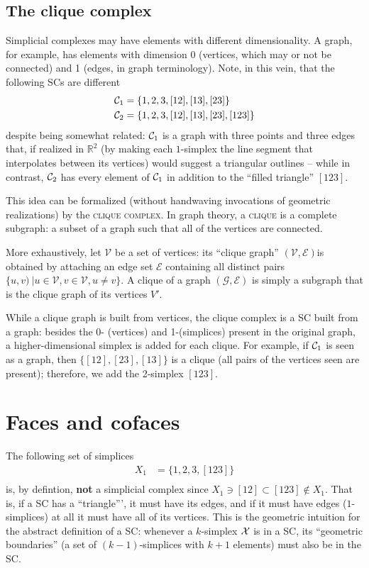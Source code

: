 \documentclass{tufte-handout}
\newcommand{\re}{\mathbb{R}}
\begin{document}
\subsection{The clique complex}
Simplicial complexes may have elements with different dimensionality. A graph, for example, has elements with dimension 0 (vertices, which may or not be connected) and 1 (edges, in graph terminology). Note, in this vein, that the following SCs are different
\begin{align*}
    \sc_1 &= \{1,2,3,[12],[13],[23]\}\\
    \sc_2 &= \{1,2,3,[12],[13],[23],[123]\}
\end{align*}
despite being somewhat related: $\sc_1$ is a graph with three points and three edges that, if realized in $\re^2$ (by making each $1$-simplex the line segment that interpolates between its vertices) would suggest a triangular outlines -- while in contrast, $\sc_2$ has every element of $\sc_1$ in addition to the ``filled triangle'' $[123]$. 

This idea can be formalized (without handwaving invocations of geometric realizations) by the \textsc{clique complex}. In graph theory, a \textsc{clique} is a complete subgraph: a subset of a graph such that all of the vertices are connected. 

More exhaustively,  let  $\mathcal V$ be a set of vertices: its ``clique graph'' $(\mathcal V, \mathcal E)$is obtained by attaching an edge set $\mathcal E$ containing all distinct pairs $\{u,v)\ | u\in \mathcal V, v \in \mathcal V, u\neq v\}$. A clique of a graph $(\mathcal G, \mathcal E)$ is simply a subgraph that is the clique graph of its vertices $V'$. 

While a clique graph is built from vertices, the clique complex is a SC built from a graph: besides the 0- (vertices) and 1-(simplices) present in the original graph, a higher-dimensional simplex is added for each clique. For example, if $\sc_1$ is seen as a graph, then  $\{[12],[23],[13]\}$ is a clique (all pairs of the vertices seen are present); therefore, we add the 2-simplex $[123]$. 


\section{Faces and cofaces}
The following set of simplices
\begin{align*}
    X_1 &= \{1,2,3,[123]\}\\
\end{align*}
is, by defintion, \textbf{not} a simplicial complex since $X_1 \ni [12]\subset [123]\not \in X_1$. That is,
if a SC has a ``triangle''', it must have its edges, and if it must have edges ($1$-simplices) at all it must have all of its vertices. This is the geometric intuition for the abstract definition of a SC:  whenever a $k$-simplex $\se$ is in a SC, its ``geometric boundaries'' (a set of $(k-1)$-simplices with $k+1$ elements) must also be in the SC. 
\end{document}
